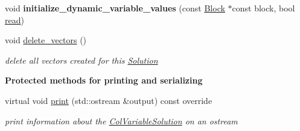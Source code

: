 \begin{DoxyCompactItemize}
void {\bfseries initialize\+\_\+dynamic\+\_\+variable\+\_\+values} (const \mbox{\hyperlink{class_s_m_spp__di__unipi__it_1_1_block}{Block}} $\ast$const block, bool \mbox{\hyperlink{class_s_m_spp__di__unipi__it_1_1_col_variable_solution_a13487898d41f593b3cc0ae6a69feb3ff}{read}})
\item 
void \mbox{\hyperlink{class_s_m_spp__di__unipi__it_1_1_col_variable_solution_adf3fbe12e764eb353caf53d81cee4cf6}{delete\+\_\+vectors}} ()
\begin{DoxyCompactList}\small\item\em delete all vectors created for this \mbox{\hyperlink{class_s_m_spp__di__unipi__it_1_1_solution}{Solution}} \end{DoxyCompactList}\end{DoxyCompactItemize}
\begin{Indent}\textbf{ Protected methods for printing and serializing}\par
\begin{DoxyCompactItemize}
\item 
virtual void \mbox{\hyperlink{class_s_m_spp__di__unipi__it_1_1_col_variable_solution_a59a9fcbf8f9f86d348344b2073644b0e}{print}} (std\+::ostream \&output) const override
\begin{DoxyCompactList}\small\item\em print information about the \mbox{\hyperlink{class_s_m_spp__di__unipi__it_1_1_col_variable_solution}{Col\+Variable\+Solution}} on an ostream \end{DoxyCompactList}\end{DoxyCompactItemize}
\end{Indent}
